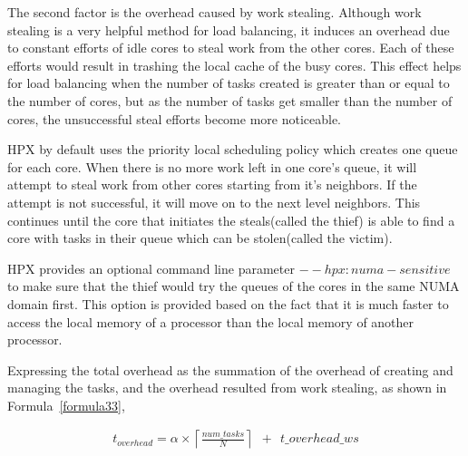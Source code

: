 
The second factor is the overhead caused by work stealing. Although work stealing is a very helpful method for load balancing, it induces an overhead due to constant efforts of idle cores to steal work from the other cores. Each of these efforts would result in trashing the local cache of the busy cores. This effect helps for load balancing when the number of tasks created is greater than or equal to the number of cores, but as the number of tasks get smaller than the number of cores, the unsuccessful steal efforts become more noticeable.

HPX by default uses the priority local scheduling policy which creates one queue for each core. When there is no more work left in one core's queue, it will attempt to steal work from other cores starting from it's neighbors. If the attempt is not successful, it will move on to the next level neighbors. This continues until the core that initiates the steals(called the thief) is able to find a core with tasks in their queue which can be stolen(called the victim). 

HPX provides an optional command line parameter ${--hpx:numa-sensitive}$ to make sure that the thief would try the queues of the cores in the same NUMA domain first. This option is provided based on the fact that it is much faster to access the local memory of a processor than the local memory of another processor.  

Expressing the total overhead as the summation of the overhead of creating and managing the tasks, and the overhead resulted from work stealing, as shown in Formula~\ref{formula33},
 
\begin{equation}\label{formula33}  
\begin{aligned}
t_{overhead}=\alpha\times{\left\lceil{\frac{num\_{tasks}}{N}}\right\rceil}\:\:+\:\:t\_{overhead\_{ws}}
\end{aligned}
\end{equation}

